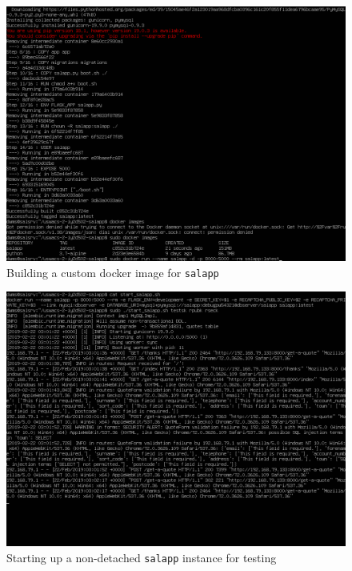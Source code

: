 \begin{figure}[h!]
\centering
\captionsetup{skip=\skipfigurecaptionlen}
\includegraphics[width=1\textwidth]{screenshots/IY2D502-2019-02-21-23-43-07.png}
\caption{Building a custom docker image for \texttt{salapp}}
\label{fig:IY2D502-2019-02-21-23-43-07}
\end{figure}
\pagebreak
\begin{figure}[h!]
\centering
\captionsetup{skip=\skipfigurecaptionlen}
\includegraphics[width=1\textwidth]{screenshots/IY2D502-2019-02-22-03-02-25.png}
\caption{Starting up a non-detached \texttt{salapp} instance for testing}
\label{fig:IY2D502-2019-02-22-03-02-25}
\end{figure}
\pagebreak
